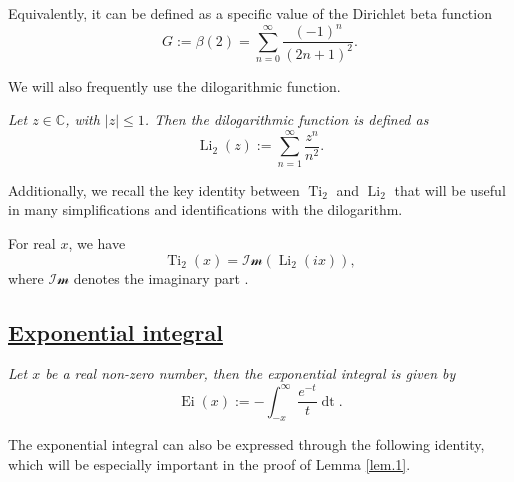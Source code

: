 \documentclass[preprint,12pt,nopreprintline]{elsarticle}
\begin{document}
Equivalently, it can be defined as a specific value of the Dirichlet beta function \cite{apostol2013introduction}
\begin{equation}
\nonumber
G:=\beta\left(2\right)=\sum_{n=0}^{\infty}\frac{\left(-1\right)^n}{\left(2n+1\right)^2}.
\end{equation}

We will also frequently use the dilogarithmic function.

\begin{definition}\cite{zagier2007dilogarithm}
\textit{Let $z\in\mathbb{C}$, with $\vert z\vert\leq 1$. Then the dilogarithmic function is defined as}
\begin{equation}
\nonumber
\operatorname{Li}_2\left(z\right):=\sum_{n=1}^{\infty}\frac{z^n}{n^2}.
\end{equation}
\end{definition}

Additionally, we recall the key identity between $\operatorname{Ti}_2$ and $\operatorname{Li}_2$ that will be useful in many simplifications and identifications with the dilogarithm.

For real $x$, we have
\begin{equation}
\nonumber
\operatorname{Ti}_2\left(x\right)=\mathscr{Im}\left(\operatorname{Li}_2\left(ix\right)\right),
\end{equation}
where $\mathscr{Im}$ denotes the imaginary part \cite{maximon2003dilogarithm}.

\newpage

\vspace{0.2cm}
\subsection{\underline{Exponential integral}}

\vspace{0.1cm}
\begin{definition}
\textit{Let $x$ be a real non-zero number, then the exponential integral is given by}
\begin{equation}
\nonumber
\operatorname{Ei}\left(x\right):=-\int_{-x}^{\infty}\frac{e^{-t}}{t}\operatorname{dt}.
\end{equation}
\end{definition}

The exponential integral can also be expressed through the following identity, which will be especially important in the proof of Lemma \ref{lem.1}.
\end{document}
